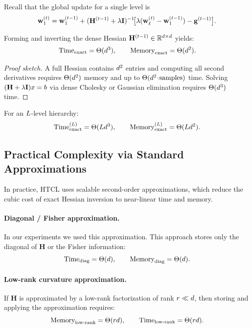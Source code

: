Recall that the global update for a single level is
\[
\mathbf{w}_{1}^{(t)} 
= \mathbf{w}_{1}^{(t-1)} 
+ (\mathbf{H}^{(t-1)} + \lambda \mathbf{I})^{-1}\!\big[\lambda(\mathbf{w}_{\ell}^{(t)} - \mathbf{w}_{1}^{(t-1)}) - \mathbf{g}^{(t-1)}\big].
\]

\begin{proposition}
Forming and inverting the dense Hessian $\mathbf{H}^{(t-1)}\in\mathbb{R}^{d\times d}$ yields:
\[
\text{Time}_{\mathrm{exact}} = \Theta(d^3), 
\qquad
\text{Memory}_{\mathrm{exact}} = \Theta(d^2).
\]
\end{proposition}

\begin{proof}[Proof sketch]
A full Hessian contains $d^2$ entries and computing all second derivatives requires  
$\Theta(d^2)$ memory and up to $\Theta(d^2 \!\cdot\! \text{samples})$ time.  
Solving $(\mathbf{H}+\lambda \mathbf{I})x=b$ via dense Cholesky or Gaussian elimination requires  
$\Theta(d^3)$ time.  
\end{proof}

\begin{corollary}
For an $L$-level hierarchy:
\[
\text{Time}_{\mathrm{exact}}^{(L)} = \Theta(L d^3),
\qquad 
\text{Memory}_{\mathrm{exact}}^{(L)} = \Theta(L d^2).
\]
\end{corollary}

\subsection{Practical Complexity via Standard Approximations}

In practice, HTCL uses scalable second-order approximations, which reduce the cubic  
cost of exact Hessian inversion to near-linear time and memory.

\paragraph{Diagonal / Fisher approximation.}  
In our experiments we used this approximation. This approach stores only the diagonal of $\mathbf{H}$ or the Fisher information:
\[
\text{Time}_{\mathrm{diag}}=\Theta(d),
\qquad 
\text{Memory}_{\mathrm{diag}}=\Theta(d).
\]

\paragraph{Low-rank curvature approximation.}  
If $\mathbf{H}$ is approximated by a low-rank factorization of rank $r\ll d$,  
then storing and applying the approximation requires:
\[
\text{Memory}_{\mathrm{low\text{-}rank}} = \Theta(rd), 
\qquad
\text{Time}_{\mathrm{low\text{-}rank}} = \Theta(rd).
\]

